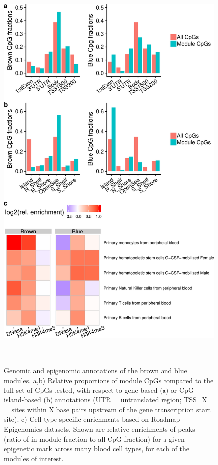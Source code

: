 \documentclass[]{article}
\theoremstyle{definition}
\theoremstyle{definition}
\theoremstyle{definition}
\theoremstyle{remark}
\begin{document}
\begin{figure}[htbp]
\centering
\includegraphics[height=20.5cm]{figures/brown-and-blue-plots-1.pdf}
\caption{\label{fig:brown-and-blue-plots}Genomic and epigenomic annotations
of the brown and blue modules. a,b) Relative proportions of module CpGs
compared to the full set of CpGs tested, with respect to gene-based (a)
or CpG island-based (b) annotations (UTR = untranslated region; TSS\_X =
sites within X base pairs upstream of the gene transcription start
site). c) Cell type-specific enrichments based on Roadmap Epigenomics
datasets. Shown are relative enrichments of peaks (ratio of in-module
fraction to all-CpG fraction) for a given epigenetic mark across many
blood cell types, for each of the modules of interest.}
\end{figure}
\end{document}
